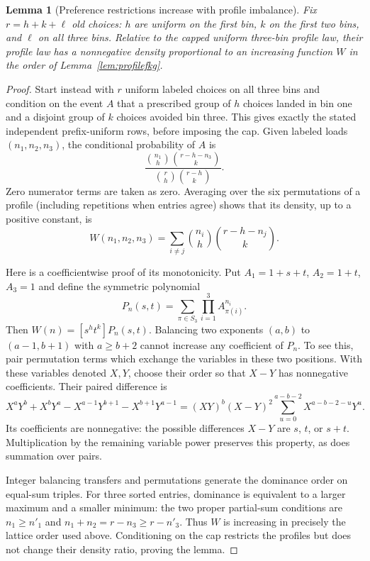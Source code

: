 \documentclass[11pt]{article}
\newtheorem{lemma}{Lemma}
\begin{document}
\begin{lemma}[Preference restrictions increase with profile imbalance]\label{lem:prefweight}
Fix $r=h+k+\ell$ old choices: $h$ are uniform on the first bin,
$k$ on the first two bins, and $\ell$ on all three bins. Relative to
the capped uniform three-bin profile law, their profile law has a
nonnegative density proportional to an increasing function $W$ in
the order of Lemma~\ref{lem:profilefkg}.
\end{lemma}
\begin{proof}
Start instead with $r$ uniform labeled choices on all three bins and
condition on the event $A$ that a prescribed group of $h$ choices
landed in bin one and a disjoint group of $k$ choices avoided bin
three. This gives exactly the stated independent prefix-uniform
rows, before imposing the cap. Given labeled loads $(n_1,n_2,n_3)$,
the conditional probability of $A$ is
\[
 \frac{\binom{n_1}h\binom{r-h-n_3}k}
      {\binom rh\binom{r-h}k}.
\]
Zero numerator terms are taken as zero. Averaging over the six
permutations of a profile (including repetitions when entries agree)
shows that its density, up to a positive constant, is
\[
 W(n_1,n_2,n_3)=
 \sum_{i\ne j}\binom{n_i}h\binom{r-h-n_j}k.
\]

Here is a coefficientwise proof of its monotonicity. Put
$A_1=1+s+t$, $A_2=1+t$, $A_3=1$ and define the symmetric polynomial
\[
 P_n(s,t)=\sum_{\pi\in S_3}\prod_{i=1}^3 A_{\pi(i)}^{n_i}.
\]
Then $W(n)=[s^h t^k]P_n(s,t)$. Balancing two exponents
$(a,b)$ to $(a-1,b+1)$ with $a\geq b+2$ cannot increase any
coefficient of $P_n$. To see this, pair permutation terms which
exchange the variables in these two positions. With these variables
denoted $X,Y$, choose their order so that $X-Y$ has nonnegative
coefficients. Their paired difference is
\[
 X^aY^b+X^bY^a-X^{a-1}Y^{b+1}-X^{b+1}Y^{a-1}
 =(XY)^b(X-Y)^2\sum_{u=0}^{a-b-2}X^{a-b-2-u}Y^u.
\]
Its coefficients are nonnegative: the possible differences $X-Y$
are $s$, $t$, or $s+t$. Multiplication by the remaining variable
power preserves this property, as does summation over pairs.

Integer balancing transfers and permutations generate the dominance
order on equal-sum triples. For three sorted entries, dominance is
equivalent to a larger maximum and a smaller minimum: the two proper
partial-sum conditions are $n_1\geq n'_1$ and
$n_1+n_2=r-n_3\geq r-n'_3$. Thus $W$ is increasing in precisely
the lattice order used above. Conditioning on the cap restricts the
profiles but does not change their density ratio, proving the lemma.
\end{proof}
\end{document}
